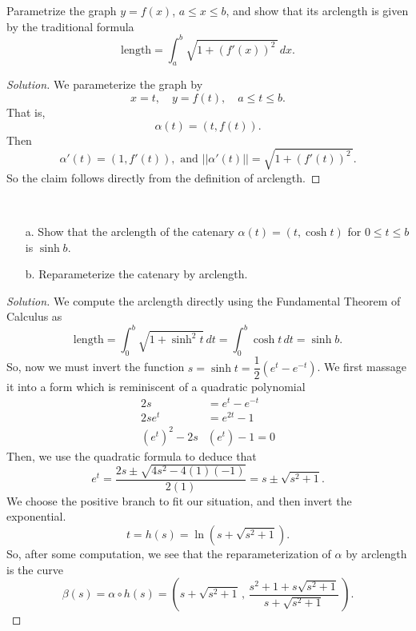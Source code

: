 \documentclass[Shifrin_Solutions_Spring_2015]{subfiles}
\begin{document}



\begin{exercise}
Parametrize the graph $y=f(x)$, $a\leq x \leq b$, and show that its arclength is given by the traditional formula
\[
\mbox{length} = \int_a^b \sqrt{1+(f'(x))^2\,}\, dx .
\]
\end{exercise}

\begin{proof}[Solution]
We parameterize the graph by
\[
x = t, \quad y = f(t), \quad a \leq t \leq b .
\]
That is,
\[
\alpha(t) = \left( t, f(t) \right).
\]
Then
\[
\alpha'(t) = \left( 1, f'(t) \right), \mbox{ and } ||\alpha'(t)|| = \sqrt{1 + (f'(t))^2\,} .
\]
So the claim follows directly from the definition of arclength.
\end{proof}




\begin{exercise}{$\ $}
\begin{itemize}
\item[a.] Show that the arclength of the catenary $\alpha(t) = (t, \cosh t)$ for $0\leq t\leq b$ is $\sinh b$.

\item[b.] Reparameterize the catenary by arclength.
\end{itemize}
\end{exercise}

\begin{proof}[Solution]
We compute the arclength directly using the Fundamental Theorem of Calculus as
\[
\text{length} = \int_0^b \sqrt{1 + \sinh^2 t } \, dt = \int_0^b \cosh t \, dt = \sinh b .
\]
So, now we must invert the function $s = \sinh t = \dfrac{1}{2} \left( e^t - e^{-t}\right)$. We first massage it into a form which is reminiscent of a quadratic polynomial
\begin{align*}
2s & = e^t - e^{-t} \\
2se^t &= e^{2t} - 1 \\
(e^t)^2  - 2 s& (e^t) - 1 = 0
\end{align*}
Then, we use the quadratic formula to deduce that
\[
e^t  = \dfrac{2s \pm \sqrt{4s^2 - 4(1)(-1)} }{2(1)} = s \pm \sqrt{s^2+1} .
\]
We choose the positive branch to fit our situation, and then invert the exponential.
\[ t = h(s) = \ln(  s + \sqrt{s^2+1} ) . \]
So, after some computation, we see that the reparameterization of $\alpha$ by arclength is the curve
\[
\beta(s) = \alpha\circ h(s) = \left(  s + \sqrt{s^2+1}\, , \,
\dfrac{s^2+1 + s\sqrt{s^2+1 } }{ s + \sqrt{s^2+1 } }\, \right).
\]
\end{proof}
\end{document}
